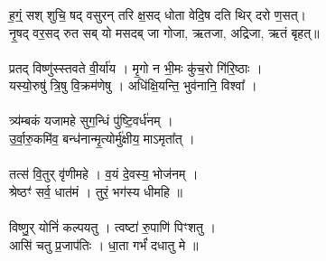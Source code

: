 \subsubsection{}
ह॒ग्ं॒ सश् शुचि॒ षद् वसुरन् तरि क्ष॒सद् धोता वेदि॒ष दति थिर् दरो ण॒सत्।\\
नृ॒षद् वर॒सद् रुत सब् यो मसदब् जा गोजा, ऋतजा, अद्रिजा, ऋतं बृहत्॥ \\
\\
प्रतद् विष्णु॑स्स्तवते वी॒र्या॑य । मृ॒गो न भी॒मः कु॑च॒रो गि॑रि॒ष्ठाः । \\
यस्यो॒रुषु॑ त्रि॒षु वि॒क्रम॑णेषु । अधि॑क्षि॒यन्ति॒ भुव॑नानि॒ विश्वा᳚  । \\
\\
त्र्य॑म्बकं यजामहे सुग॒न्धिं पु॑ष्टि॒वर्ध॑नम् ।\\
उ॒र्वा॒रु॒कमि॑व॒ बन्ध॑नान्मृ॒त्योर्मु॑क्षीय॒ माऽमृता᳚त् ।\\
\\
तत्स॑ वि॒तुर् वृ॑णीमहे । व॒यं दे॒वस्य॒ भोज॑नम् । \\
श्रेष्ठꣳ॑  सर्व॒ धात॑मं । तुरं॒ भग॑स्य धीमहि ॥\\
\\
विष्णु॒र् योनिं॑ कल्पयतु । त्वष्टा॑ रु॒पाणि॑ पिꣳशतु । \\
आसि॑ चतु प्र॒जाप॑तिः । धा॒ता गर्भं॑ दधातु मे ॥\\
